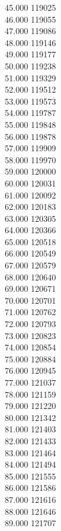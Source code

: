 { 45.000	119025 \\
 46.000	119055 \\
 47.000	119086 \\
 48.000	119146 \\
 49.000	119177 \\
 50.000	119238 \\
 51.000	119329 \\
 52.000	119512 \\
 53.000	119573 \\
 54.000	119787 \\
 55.000	119848 \\
 56.000	119878 \\
 57.000	119909 \\
 58.000	119970 \\
 59.000	120000 \\
 60.000	120031 \\
 61.000	120092 \\
 62.000	120183 \\
 63.000	120305 \\
 64.000	120366 \\
 65.000	120518 \\
 66.000	120549 \\
 67.000	120579 \\
 68.000	120640 \\
 69.000	120671 \\
 70.000	120701 \\
 71.000	120762 \\
 72.000	120793 \\
 73.000	120823 \\
 74.000	120854 \\
 75.000	120884 \\
 76.000	120945 \\
 77.000	121037 \\
 78.000	121159 \\
 79.000	121220 \\
 80.000	121342 \\
 81.000	121403 \\
 82.000	121433 \\
 83.000	121464 \\
 84.000	121494 \\
 85.000	121555 \\
 86.000	121586 \\
 87.000	121616 \\
 88.000	121646 \\
 89.000	121707 \\
}
